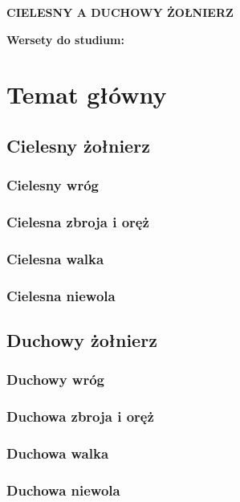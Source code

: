 \documentclass[10pt,a4paper,oneside]{article}
\begin{document}
\centerline{\textbf{\MakeUppercase{Cielesny a duchowy żołnierz}}}
\begin{center}
\textbf{Wersety do studium:} 

\end{center}
\section{Temat główny}
\subsection{Cielesny żołnierz}
\subsubsection{Cielesny wróg}
\subsubsection{Cielesna zbroja i oręż}
\subsubsection{Cielesna walka}
\subsubsection{Cielesna niewola}
\subsection{Duchowy żołnierz}
\subsubsection{Duchowy wróg}
\subsubsection{Duchowa zbroja i oręż}
\subsubsection{Duchowa walka}
\subsubsection{Duchowa niewola}
\end{document}
